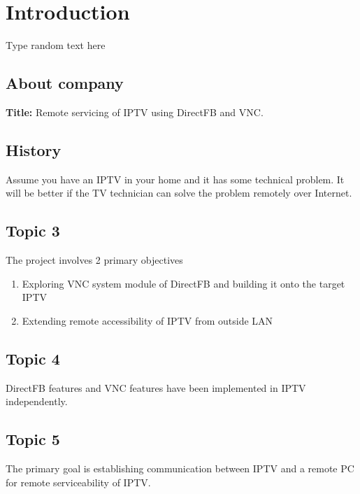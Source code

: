 \chapter{Introduction}
Type random text here
\section{About company}
\textbf{Title:} Remote servicing of IPTV using DirectFB and VNC.

\section{History}
Assume you have an IPTV in your home and it has some technical problem. It will be better if the TV technician can solve the problem remotely over Internet. 

\section{Topic 3}
The project involves 2 primary objectives
\begin{enumerate}
\item Exploring VNC system module of DirectFB and building it onto the target IPTV
\item Extending remote accessibility of IPTV from outside LAN
\end{enumerate}

\section{Topic 4}
DirectFB features and VNC features have been implemented in IPTV independently.

\section{Topic 5}
The primary goal is establishing communication between IPTV and a remote PC for remote serviceability of IPTV.



